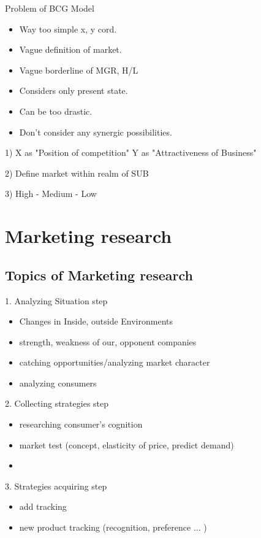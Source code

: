 \documentclass[12pt]{article}
\begin{document}
Problem of BCG Model

\begin{itemize}
  \item Way too simple x, y cord.
  \item Vague definition of market.
  \item Vague borderline of MGR, H/L
  \item Considers only present state.
  \item Can be too drastic.
  \item Don't consider any synergic possibilities.
\end{itemize}

1) X as "Position of competition" Y as "Attractiveness of Business"

2) Define market within realm of SUB

3) High - Medium - Low


\section{Marketing research}

\subsection{Topics of Marketing research}

1. Analyzing Situation step
\begin{itemize}
	\item Changes in Inside, outside Environments
	\item strength, weakness of our, opponent companies
	\item catching opportunities/analyzing market character
	\item analyzing consumers
\end{itemize}

2. Collecting strategies step
\begin{itemize}
	\item researching consumer's cognition
	\item market test (concept, elasticity of price, predict demand)
	\item
\end{itemize}

3. Strategies acquiring step
\begin{itemize}
	\item add tracking
	\item new product tracking (recognition, preference ... )
\end{itemize}
\end{document}
